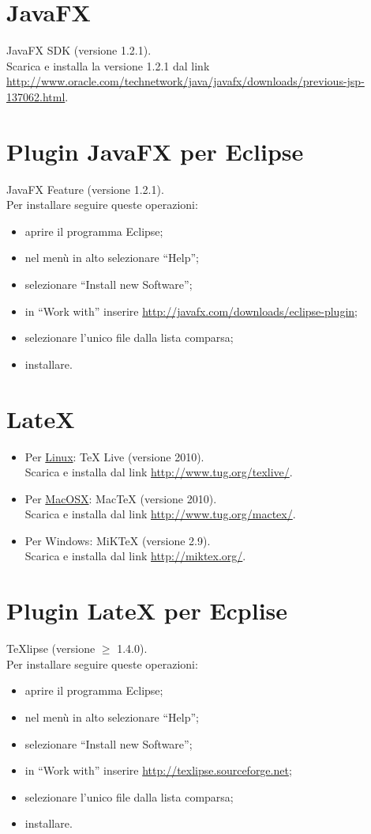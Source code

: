 \section{JavaFX}
JavaFX SDK (versione 1.2.1).
\\
Scarica e installa la versione 1.2.1 dal link \\
\url{http://www.oracle.com/technetwork/java/javafx/downloads/previous-jsp-137062.html}.

\section{Plugin JavaFX per Eclipse}
JavaFX Feature (versione 1.2.1).
\\
Per installare seguire queste
operazioni: 
\begin{itemize}
\item {aprire il programma Eclipse;} 
\item {nel men\`u in alto selezionare ``Help'';}
\item {selezionare ``Install new Software'';}
\item {in ``Work with'' inserire \url{http://javafx.com/downloads/eclipse-plugin};}
\item {selezionare l'unico file dalla lista comparsa;}
\item {installare.}
\end{itemize} 

\section{LateX}
\begin{itemize}
\item {Per \underline{Linux}: TeX Live (versione 2010). 
\\
Scarica e installa dal link
\url{http://www.tug.org/texlive/}.}
\item {Per \underline{MacOSX}: MacTeX (versione 2010). 
\\
Scarica e installa dal link
\url{http://www.tug.org/mactex/}.}
\item {Per Windows: MiKTeX (versione 2.9). 
\\
Scarica e installa dal link
\url{http://miktex.org/}.}
\end{itemize}

\section{Plugin LateX per Ecplise}
TeXlipse (versione $\geq$ 1.4.0). 
\\
Per installare seguire queste
operazioni: 
\begin{itemize}
\item {aprire il programma Eclipse;} 
\item {nel men\`u in alto selezionare ``Help'';}
\item {selezionare ``Install new Software'';}
\item {in ``Work with'' inserire \url{http://texlipse.sourceforge.net};}
\item {selezionare l'unico file dalla lista comparsa;}
\item {installare.}
\end{itemize} 

